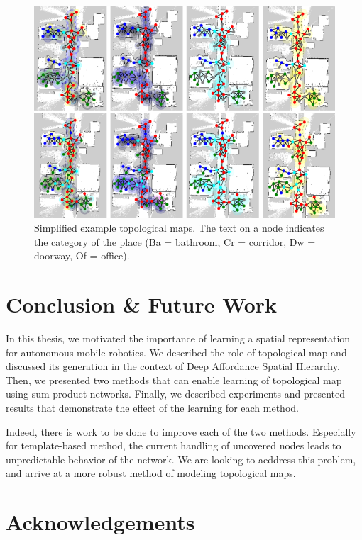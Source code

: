 \documentclass[11pt, titlepage]{article}
\theoremstyle{definition}
\begin{document}
\begin{figure}[!htb]
    \centering
    \captionsetup{width=.8\linewidth}
    \includegraphics[scale=0.8]{images/topo_result.png}
    \caption{Simplified example topological maps. The text on a node indicates the category of the place (Ba = bathroom, Cr = corridor, Dw = doorway, Of = office).}
    \label{fig:tmpl_result}
\end{figure}
\section{Conclusion \& Future Work}\label{section:conclusion}

In this thesis, we motivated the importance of learning a spatial representation for autonomous mobile robotics. We described the role of topological map and discussed its generation in the context of Deep Affordance Spatial Hierarchy. Then, we presented two methods that can enable learning of topological map using sum-product networks. Finally, we described experiments and presented results that demonstrate the effect of the learning for each method.

Indeed, there is work to be done to improve each of the two methods. Especially for template-based method, the current handling of uncovered nodes leads to unpredictable behavior of the network. We are looking to aeddress this problem, and arrive at a more robust method of modeling topological maps.

\section{Acknowledgements}\label{section:acknowledgement}
\end{document}
